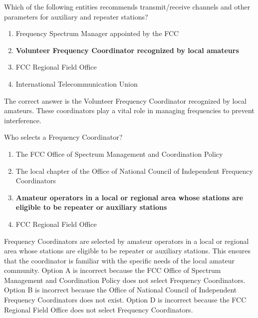 \begin{tcolorbox}[colback=gray!10!white,colframe=black!75!black,title={T1A08}]
    Which of the following entities recommends transmit/receive channels and other parameters for auxiliary and repeater stations?
    \begin{enumerate}[label=\Alph*),noitemsep]
        \item Frequency Spectrum Manager appointed by the FCC
        \item \textbf{Volunteer Frequency Coordinator recognized by local amateurs}
        \item FCC Regional Field Office
        \item International Telecommunication Union
    \end{enumerate}
\end{tcolorbox}
The correct answer is the Volunteer Frequency Coordinator recognized by local amateurs. These coordinators play a vital role in managing frequencies to prevent interference.

\begin{tcolorbox}[colback=gray!10!white,colframe=black!75!black,title={T1A09}]
    Who selects a Frequency Coordinator?
    \begin{enumerate}[label=\Alph*),noitemsep]
        \item The FCC Office of Spectrum Management and Coordination Policy
        \item The local chapter of the Office of National Council of Independent Frequency Coordinators
        \item \textbf{Amateur operators in a local or regional area whose stations are eligible to be repeater or auxiliary stations}
        \item FCC Regional Field Office
    \end{enumerate}
\end{tcolorbox}
Frequency Coordinators are selected by amateur operators in a local or regional area whose stations are eligible to be repeater or auxiliary stations. This ensures that the coordinator is familiar with the specific needs of the local amateur community. Option A is incorrect because the FCC Office of Spectrum Management and Coordination Policy does not select Frequency Coordinators. Option B is incorrect because the Office of National Council of Independent Frequency Coordinators does not exist. Option D is incorrect because the FCC Regional Field Office does not select Frequency Coordinators.

